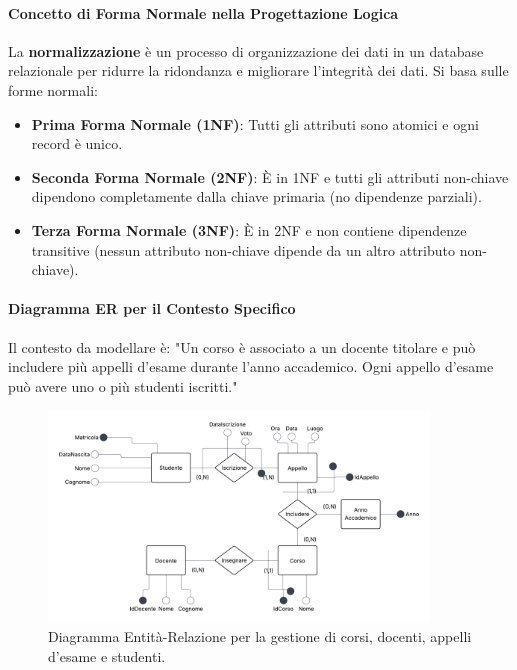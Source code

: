 \paragraph{Concetto di Forma Normale nella Progettazione Logica}
La \textbf{normalizzazione} è un processo di organizzazione dei dati in un database relazionale per ridurre la ridondanza e migliorare l'integrità dei dati. Si basa sulle forme normali:
\begin{itemize}
    \item \textbf{Prima Forma Normale (1NF)}: Tutti gli attributi sono atomici e ogni record è unico.
    \item \textbf{Seconda Forma Normale (2NF)}: È in 1NF e tutti gli attributi non-chiave dipendono completamente dalla chiave primaria (no dipendenze parziali).
    \item \textbf{Terza Forma Normale (3NF)}: È in 2NF e non contiene dipendenze transitive (nessun attributo non-chiave dipende da un altro attributo non-chiave).
\end{itemize}

\paragraph{Diagramma ER per il Contesto Specifico}
Il contesto da modellare è: "Un corso è associato a un docente titolare e può includere più appelli d'esame durante l'anno accademico. Ogni appello d'esame può avere uno o più studenti iscritti."

\begin{figure}[h!]
    \centering
    \includegraphics[width=0.9\textwidth]{capitoli/basi_di_dati/domande_teoriche/immagini/er_esame_stato_corsi_docenti_appelli.png}
    \caption{Diagramma Entità-Relazione per la gestione di corsi, docenti, appelli d'esame e studenti.}
    \label{fig:er_esame_stato_corsi_docenti_appelli}
\end{figure}

